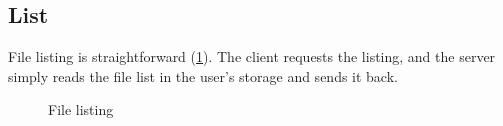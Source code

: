 \subsection{List}
File listing is straightforward (\cref{fig:transport_protocol_file_listing}). The client requests the listing, and the server simply reads the file list in the user's storage and sends it back.
\begin{figure}
    \centering
    \setlength{\instdist}{8.5cm}
    \setmscoptions
    \begin{msc}{}



        \nextlevel[2]

        \nextlevel[3]

        \nextlevel

        \nextlevel[3]

        \nextlevel
    \end{msc}
    \centering
    \caption{File listing}
    \label{fig:transport_protocol_file_listing}
\end{figure}

